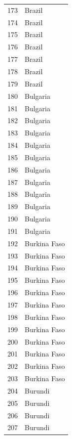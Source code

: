 \documentclass[
  letterpaper,
  DIV=11,
  numbers=noendperiod]{scrreprt}
\begin{document}
\begin{tabular}{ll}
173  &                    Brazil \\
174  &                    Brazil \\
175  &                    Brazil \\
176  &                    Brazil \\
177  &                    Brazil \\
178  &                    Brazil \\
179  &                    Brazil \\
180  &                  Bulgaria \\
181  &                  Bulgaria \\
182  &                  Bulgaria \\
183  &                  Bulgaria \\
184  &                  Bulgaria \\
185  &                  Bulgaria \\
186  &                  Bulgaria \\
187  &                  Bulgaria \\
188  &                  Bulgaria \\
189  &                  Bulgaria \\
190  &                  Bulgaria \\
191  &                  Bulgaria \\
192  &              Burkina Faso \\
193  &              Burkina Faso \\
194  &              Burkina Faso \\
195  &              Burkina Faso \\
196  &              Burkina Faso \\
197  &              Burkina Faso \\
198  &              Burkina Faso \\
199  &              Burkina Faso \\
200  &              Burkina Faso \\
201  &              Burkina Faso \\
202  &              Burkina Faso \\
203  &              Burkina Faso \\
204  &                   Burundi \\
205  &                   Burundi \\
206  &                   Burundi \\
207  &                   Burundi \\

\end{tabular}
\end{document}
